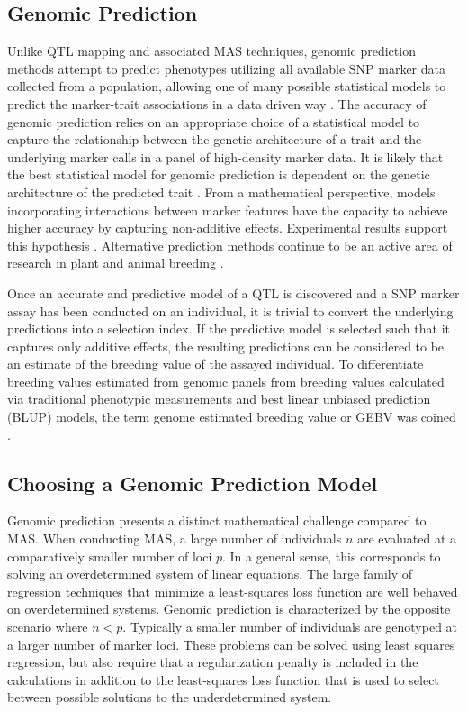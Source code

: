 \subsection*{Genomic Prediction}

Unlike QTL mapping and associated MAS techniques, genomic prediction methods
attempt to predict phenotypes utilizing all available SNP marker data collected 
from a population, allowing one of many possible statistical models to predict 
the marker-trait associations in a data driven way \citep{meuwissen2001}. 
The accuracy of genomic prediction relies on an appropriate choice of a 
statistical model to capture the relationship between the genetic architecture
of a trait and the underlying marker calls in a panel of high-density marker 
data. It is likely that the best statistical model for genomic prediction is 
dependent on the genetic architecture of
the predicted trait \citep{crossa2010, gonzalez-camacho2012, 
resende2012, cleveland2012, thavamanikumar2015}.  From a mathematical perspective,
models incorporating interactions between marker features have the 
capacity to achieve higher accuracy by capturing non-additive effects.
Experimental results support this hypothesis \citep{gonzalez-camacho2012}. 
Alternative prediction methods continue to be an active area of research 
in plant and animal breeding \citep{koning2012}.

Once an accurate and predictive model of a QTL is discovered and a SNP marker
assay has been conducted on an individual, it is trivial to convert the underlying
predictions into a selection index. If the predictive model is selected 
such that it captures only additive effects, the resulting predictions can be 
considered to be an estimate of the breeding value of the assayed individual.
To differentiate breeding values estimated from genomic panels from breeding values
calculated via traditional phenotypic measurements and best linear unbiased prediction (BLUP)
models, the term genome estimated breeding value or GEBV was coined \citep{meuwissen2001}.

\subsection*{Choosing a Genomic Prediction Model}

Genomic prediction presents a distinct mathematical challenge compared to MAS.
When conducting MAS, a large number of individuals $n$ are evaluated at a
comparatively smaller number of loci $p$. In a general sense, this corresponds 
to solving an overdetermined system of linear equations. The large family of 
regression techniques that minimize a least-squares loss function are well
behaved on overdetermined systems. Genomic prediction is characterized by the opposite
scenario where $n < p$. Typically a smaller number of individuals are genotyped
at a larger number of marker loci. These problems can be solved using least squares regression,
but also require that a regularization penalty is included in the calculations in 
addition to the least-squares loss function that is used to select between 
possible solutions to the underdetermined system.

